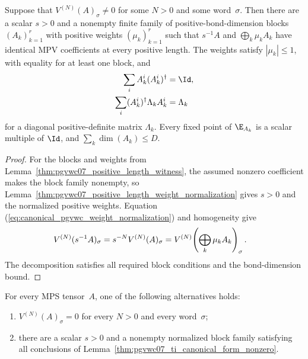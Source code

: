 \begin{lemma}%
    \label{thm:pgvwc07_ti_canonical_form_nonzero}
    \leanok
    Suppose that $V^{(N)}(A)_\sigma\neq0$ for some $N>0$ and some
    word~$\sigma$. Then there are a scalar $s>0$ and a nonempty finite family
    of positive-bond-dimension blocks $(A_k)_{k=1}^r$ with positive weights
    $(\mu_k)_{k=1}^r$ such that $s^{-1}A$ and
    $\bigoplus_k\mu_kA_k$ have identical MPV coefficients at every positive
    length. The weights satisfy $|\mu_k|\le1$, with equality for at least one
    block, and
    \begin{align}
        \sum_i A_k^i(A_k^i)^\dagger
         & =\Id,
        \notag        \\
        \sum_i(A_k^i)^\dagger\Lambda_kA_k^i
         & =\Lambda_k
        \label{eq:canonical_pgvwc_nonzero_block_conditions}
    \end{align}
    for a diagonal positive-definite matrix $\Lambda_k$. Every fixed point of
    $\E_{A_k}$ is a scalar multiple of $\Id$, and
    $\sum_k\dim(A_k)\le D$.
\end{lemma}

\begin{proof}\leanok
    For the blocks and weights from
    Lemma~\ref{thm:pgvwc07_positive_length_witness}, the assumed nonzero
    coefficient makes the block family nonempty, so
    Lemma~\ref{thm:pgvwc07_positive_length_weight_normalization} gives
    $s>0$ and the normalized positive weights. Equation
    (\ref{eq:canonical_pgvwc_weight_normalization}) and homogeneity give
    \begin{align}
        V^{(N)}(s^{-1}A)_\sigma
         & =s^{-N}V^{(N)}(A)_\sigma
        =V^{(N)}\!\left(\bigoplus_k\mu_kA_k\right)_\sigma.
        \notag
    \end{align}
    The decomposition satisfies all required block conditions and the
    bond-dimension bound.
\end{proof}

\begin{lemma}%
    \label{thm:pgvwc07_ti_canonical_form_dichotomy}
    \leanok
    For every MPS tensor~$A$, one of the following alternatives holds:
    \begin{enumerate}
        \item $V^{(N)}(A)_\sigma=0$ for every $N>0$ and every
              word~$\sigma$;
        \item there are a scalar $s>0$ and a nonempty normalized block family
              satisfying all conclusions of
              Lemma~\ref{thm:pgvwc07_ti_canonical_form_nonzero}.
    \end{enumerate}
\end{lemma}

